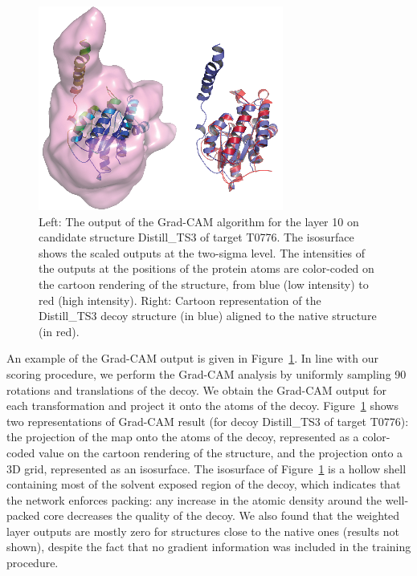 \documentclass{bioinfo}
\begin{document}
\begin{figure}[!tpb]
    \centering
    \includegraphics[width=\linewidth]{image6.eps}
    \caption{Left: The output of the Grad-CAM algorithm for the layer 10 on
    candidate structure Distill\_TS3 of target T0776. The isosurface
    shows the scaled outputs at the two-sigma level. The intensities
    of the outputs at the positions of the protein atoms are
    color-coded on the cartoon rendering of the structure, from blue
    (low intensity) to red (high intensity). Right: Cartoon
    representation of the Distill\_TS3 decoy structure (in blue)
    aligned to the native structure (in red).}
    \label{Fig:GradCAMT0776}
\end{figure}

An example of the Grad-CAM output is given in Figure~\ref{Fig:GradCAMT0776}.
In line with our scoring procedure, we perform the Grad-CAM analysis
by uniformly sampling 90 rotations and translations of the decoy. We
obtain the Grad-CAM output for each transformation and
project it onto the atoms of the decoy. 
Figure~\ref{Fig:GradCAMT0776} shows two representations of Grad-CAM result 
(for decoy Distill\_TS3 of target T0776): the
projection of the map onto the atoms of the decoy, represented as a
color-coded value on the cartoon rendering of the structure, and the
projection onto a 3D grid, represented as an isosurface. The
isosurface of Figure~\ref{Fig:GradCAMT0776} is a hollow shell containing
most of the solvent exposed region of the decoy, which indicates that
the network enforces packing: any increase in the atomic density
around the well-packed core decreases the quality of the decoy.
We also found that the weighted layer outputs are mostly zero for
structures close to the native ones (results not shown), despite the
fact that no gradient information was included in the training
procedure.
\end{document}
